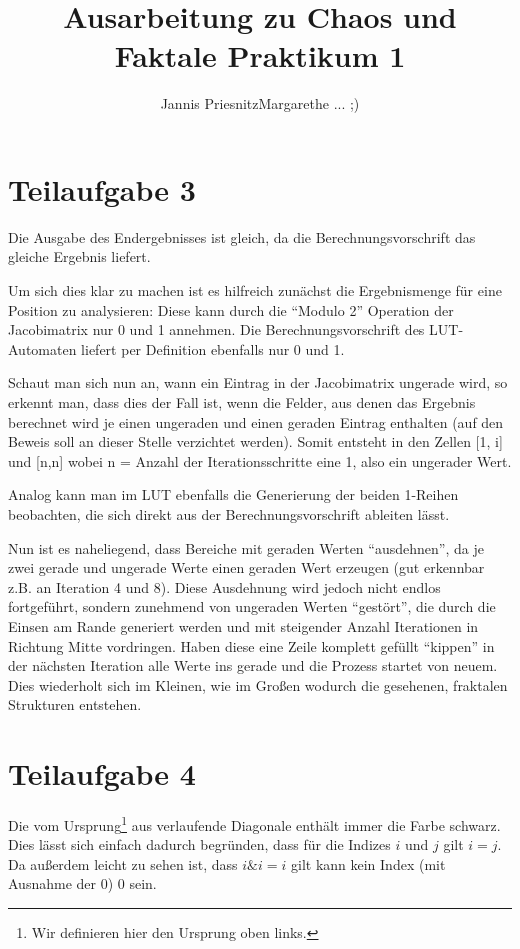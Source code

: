 \documentclass[]{article}
\title{Ausarbeitung zu Chaos und Faktale Praktikum 1}
\author{Jannis Priesnitz\space \textperiodcentered \space Margarethe ... ;)}
\begin{document}
\maketitle
\begin{center}

\end{center}
\section{Teilaufgabe 3}
Die Ausgabe des Endergebnisses ist gleich, da die Berechnungsvorschrift das gleiche Ergebnis liefert. 

Um sich dies klar zu machen ist es hilfreich zunächst die Ergebnismenge für eine Position zu analysieren: Diese kann durch die "`Modulo 2"' Operation der Jacobimatrix nur 0 und 1 annehmen. Die Berechnungsvorschrift des LUT-Automaten liefert per Definition ebenfalls nur 0 und 1.

Schaut man sich nun an, wann ein Eintrag in der Jacobimatrix ungerade wird, so erkennt man, dass dies der Fall ist, wenn die Felder, aus denen das Ergebnis berechnet wird je einen ungeraden und einen geraden Eintrag enthalten (auf den Beweis soll an dieser Stelle verzichtet werden). Somit entsteht in den Zellen [1, i] und [n,n] wobei n = Anzahl der Iterationsschritte eine 1, also ein ungerader Wert. 

Analog kann man im LUT ebenfalls die Generierung der beiden 1-Reihen beobachten, die sich direkt aus der Berechnungsvorschrift ableiten lässt. 

Nun ist es naheliegend, dass Bereiche mit geraden Werten "`ausdehnen"', da je zwei gerade und ungerade Werte einen geraden Wert erzeugen (gut erkennbar z.B. an Iteration 4 und 8). Diese Ausdehnung wird jedoch nicht endlos fortgeführt, sondern zunehmend von ungeraden Werten "`gestört"', die durch die Einsen am Rande generiert werden und mit steigender Anzahl Iterationen in Richtung Mitte vordringen. Haben diese eine Zeile komplett gefüllt "`kippen"' in der nächsten Iteration alle Werte ins gerade und die Prozess startet von neuem. Dies wiederholt sich im Kleinen, wie im Großen wodurch die gesehenen, fraktalen Strukturen entstehen.

\section{Teilaufgabe 4}
Die vom Ursprung\footnote{Wir definieren hier den Ursprung oben links.} aus verlaufende Diagonale enthält immer die Farbe schwarz. Dies lässt sich einfach dadurch begründen, dass für die Indizes $i$ und $j$ gilt $i = j$. Da außerdem leicht zu sehen ist, dass $i \& i = i$ gilt kann kein Index (mit Ausnahme der $0$) $0$ sein.
\end{document}
